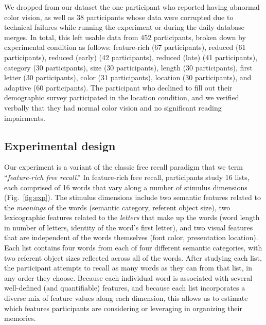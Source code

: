 \documentclass[11pt]{article}
\begin{document}
We dropped from our dataset the one participant who reported having abnormal
color vision, as well as 38 participants whose data were corrupted due to
technical failures while running the experiment or during the daily database
merges. In total, this left usable data from 452 participants, broken down by
experimental condition as follows: feature-rich (67 participants), reduced (61
participants), reduced (early) (42 participants), reduced (late) (41
participants), category (30 participants), size (30 participants), length (30
participants), first letter (30 participants), color (31 participants),
location (30 participants), and adaptive (60 participants). The participant who
declined to fill out their demographic survey participated in the location
condition, and we verified verbally that they had normal color vision and no
significant reading impairments.




\subsection*{Experimental design}

Our experiment is a variant of the classic free recall paradigm that we term
``\textit{feature-rich free recall}.'' In feature-rich free recall,
participants study 16 lists, each comprised of 16 words that vary along a
number of stimulus dimensions (Fig.~\ref{fig:exp}). The stimulus dimensions
include two semantic features related to the \textit{meanings} of the words
(semantic category, referent object size), two lexicographic features related
to the \textit{letters} that make up the words (word length in number of
letters, identity of the word's first letter), and two visual features that are
independent of the words themselves (font color, presentation location). Each
list contains four words from each of four different semantic categories, with
two referent object sizes reflected across all of the words. After studying
each list, the participant attempts to recall as many words as they can from
that list, in any order they choose. Because each individual word is associated
with several well-defined (and quantifiable) features, and because each list
incorporates a diverse mix of feature values along each dimension, this allows
us to estimate which features participants are considering or leveraging in
organizing their memories.
\end{document}
